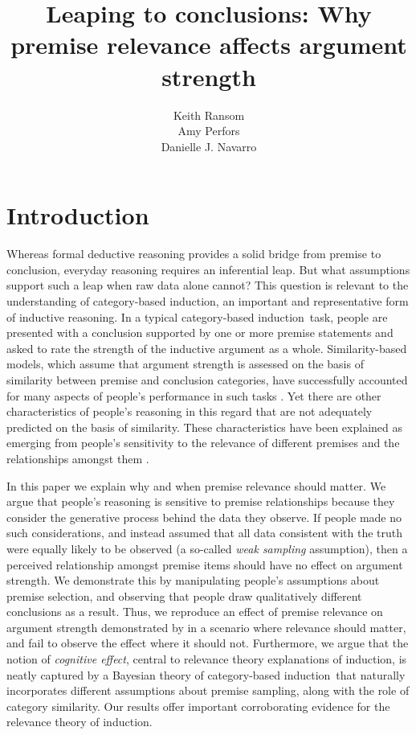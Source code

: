 \documentclass[doc,12pt]{apa}
\title{Leaping to conclusions: Why premise relevance affects argument strength}
\author{\normalsize Keith Ransom \\ Amy Perfors \\ Danielle J. Navarro}
\affiliation{School of Psychology \\ University of Adelaide}
\newcommand{\cbi}{category-based induction}
\begin{document}
\maketitle
\noindent


\section{Introduction}
\label{intro}

Whereas formal deductive reasoning provides a solid bridge from premise to conclusion, everyday reasoning requires an inferential leap.
%
But what assumptions support such a leap when raw data alone cannot?  This question is relevant to the understanding of \cbi, an important and representative form of inductive reasoning. In a typical \cbi\ task, people are presented with a conclusion supported by one or more premise statements and asked to rate the strength of the inductive argument as a whole. Similarity-based models, which assume that argument strength is assessed on the basis of similarity between premise and conclusion categories, have successfully accounted for many aspects of people's performance in such tasks \cite{Osh90,Slo93}. Yet there are other characteristics of people's reasoning in this regard that are not adequately predicted on the basis of similarity. These characteristics have been explained as emerging from people's sensitivity to the relevance of different
premises and the relationships amongst them \cite{MCSH03}.
%

In this paper we explain why and when premise relevance should matter.
We argue that people's reasoning is sensitive to premise relationships because they consider the generative process behind the data they observe. If people made no such considerations, and instead assumed that all data consistent with the truth were equally likely to be observed (a so-called {\em weak sampling} assumption), then a perceived relationship amongst premise items should have no effect on argument strength. We demonstrate this by manipulating people's assumptions about premise selection, and observing that people draw qualitatively different conclusions as a result.  Thus, we reproduce an effect of premise relevance on argument strength demonstrated by  in a scenario where relevance should matter, and fail to observe the effect where it should not. Furthermore, we argue that the notion of {\em cognitive effect}, central to relevance theory explanations of induction, is neatly captured by a Bayesian theory of \cbi\ that naturally incorporates different assumptions about premise sampling, along with the role of category similarity. Our results offer important corroborating evidence for the relevance theory of induction.
%
\end{document}
